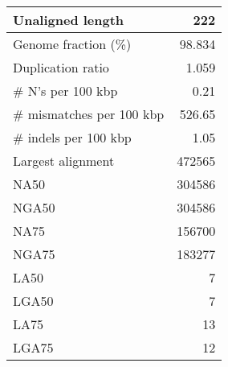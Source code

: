 \documentclass[12pt,a4paper]{article}
\begin{document}
\begin{table}[ht]
\begin{center}
\begin{tabular}{|l*{1}{|r}|}
Unaligned length & 222 \\ \hline
Genome fraction (\%) & 98.834 \\ \hline
Duplication ratio & 1.059 \\ \hline
\# N's per 100 kbp & 0.21 \\ \hline
\# mismatches per 100 kbp & 526.65 \\ \hline
\# indels per 100 kbp & 1.05 \\ \hline
Largest alignment & 472565 \\ \hline
NA50 & 304586 \\ \hline
NGA50 & 304586 \\ \hline
NA75 & 156700 \\ \hline
NGA75 & 183277 \\ \hline
LA50 & 7 \\ \hline
LGA50 & 7 \\ \hline
LA75 & 13 \\ \hline
LGA75 & 12 \\ \hline
\end{tabular}
\end{center}
\end{table}
\end{document}
